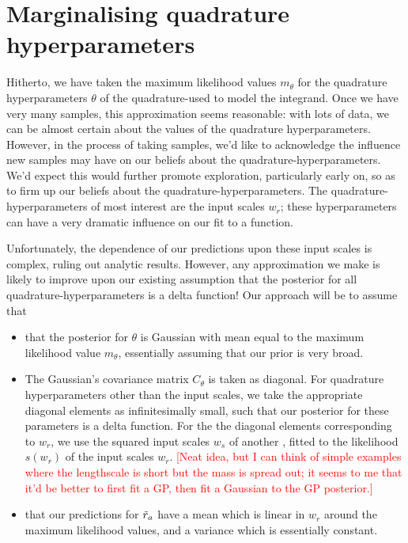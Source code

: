 \documentclass{article}
\begin{document}
\section{Marginalising quadrature hyperparameters}

Hitherto, we have taken the maximum likelihood values $m_\theta$ for the quadrature hyperparameters $\theta$ of the quadrature-\gpb used to model the integrand. Once we have very many samples, this approximation seems reasonable: with lots of data, we can be almost certain about the values of the quadrature hyperparameters. However, in the process of taking samples, we'd like to acknowledge the influence new samples may have on our beliefs about the quadrature-hyperparameters. We'd expect this would further promote exploration, particularly early on, so as to firm up our beliefs about the quadrature-hyperparameters. The quadrature-hyperparameters of most interest are the input scales $w_r$; these hyperparameters can have a very dramatic influence on our fit to a function.

Unfortunately, the dependence of our predictions upon these input scales is complex, ruling out analytic results. However, any approximation we make is likely to improve upon our existing assumption that the posterior for all quadrature-hyperparameters is a delta function! Our approach will be to assume that
\begin{itemize}
 \item that the posterior for $\theta$ is Gaussian with mean equal to the maximum likelihood value $m_\theta$, essentially assuming that our prior is very broad. 
\item The Gaussian's covariance matrix $C_\theta$ is taken as diagonal. For quadrature hyperparameters other than the input scales, we take the appropriate diagonal elements as infinitesimally small, such that our posterior for these parameters is a delta function. For the the diagonal elements corresponding to $w_r$, we use the squared input scales $w_s$ of another \gp, fitted to the likelihood $s(w_r)$ of the input scales $w_r$. \textcolor{red}{[Neat idea, but I can think of simple examples where the lengthscale is short but the mass is spread out; it seems to me that it'd be better to first fit a GP, then fit a Gaussian to the GP posterior.]}
\item that our predictions for $\tr_a$ have a mean which is linear in $w_r$ around the maximum likelihood values, and a variance which is essentially constant.  
\end{itemize}
 
\end{document}
